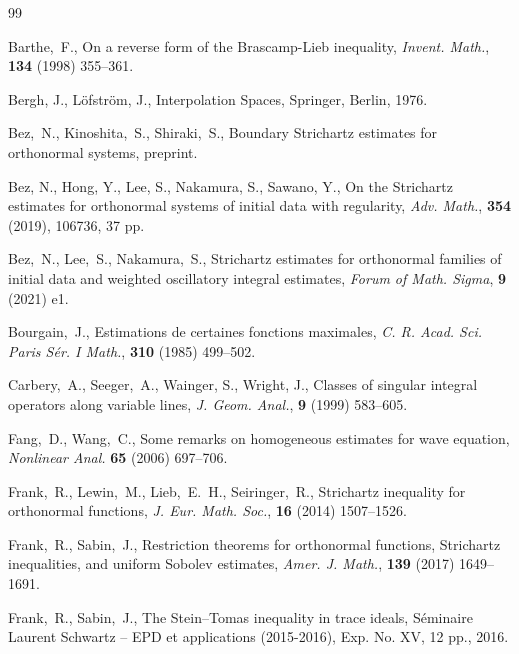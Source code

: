 \documentclass[a4paper]{amsart}
\numberwithin{equation}{section}%
\theoremstyle{plain}%
\theoremstyle{definition}
\theoremstyle{remark}%
\begin{document}

\begin{thebibliography}{99}
%

Barthe,~F., 
On a reverse form of the Brascamp-Lieb inequality,
\textit{Invent. Math.}, \textbf{134} (1998) 355--361.

 Bergh, J., L\"{o}fstr\"{o}m, J., 
Interpolation Spaces, Springer, Berlin, 1976.

Bez,~N., Kinoshita,~S., Shiraki,~S., 
Boundary Strichartz estimates for orthonormal systems,
preprint.

 Bez, N., Hong, Y., Lee, S., Nakamura, S., Sawano, Y., 
On the Strichartz estimates for orthonormal systems of initial data with regularity, 
\textit{Adv. Math.},
\textbf{354} (2019), 106736, 37 pp. 

Bez,~N., Lee,~S., Nakamura,~S., 
Strichartz estimates for orthonormal families of initial data and weighted oscillatory integral estimates, 
\textit{Forum of Math. Sigma}, 
\textbf{9} (2021) e1.

Bourgain,~J., 
Estimations de certaines fonctions maximales, 
\textit{C. R. Acad. Sci. Paris S\'{e}r. I Math.}, 
\textbf{310} (1985) 499--502.

Carbery,~A., Seeger,~A., Wainger, S., Wright, J., 
Classes of singular integral operators along variable lines, 
\textit{J. Geom. Anal.}, 
\textbf{9} (1999) 583--605.

Fang,~D., Wang,~C., 
Some remarks on homogeneous estimates for wave equation, 
\textit{Nonlinear Anal.} 
\textbf{65} (2006) 697--706.

Frank,~R., Lewin,~M., Lieb,~E.~H., Seiringer,~R., 
Strichartz inequality for orthonormal functions, 
\textit{J. Eur. Math. Soc.}, 
\textbf{16} (2014) 1507--1526.

Frank,~R., Sabin,~J., 
Restriction theorems for orthonormal functions, Strichartz inequalities, and uniform Sobolev estimates, 
\textit{Amer. J. Math.}, 
\textbf{139} (2017) 1649--1691.

Frank,~R., Sabin,~J.,  
The Stein--Tomas inequality in trace ideals, 
S\'eminaire Laurent Schwartz -- EPD et applications (2015-2016), 
Exp. No. XV, 12 pp., 2016.


\end{thebibliography}
\end{document}
